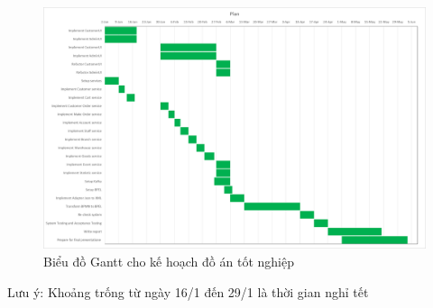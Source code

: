 \begin{figure}[h]
    \begin{center}
        \includegraphics[width=14cm]{img/plan.png}
    \end{center}
    \caption{Biểu đồ Gantt cho kế hoạch đồ án tốt nghiệp}
\end{figure}
 
Lưu ý: Khoảng trống từ ngày 16/1 đến 29/1 là thời gian nghỉ tết

\newpage
